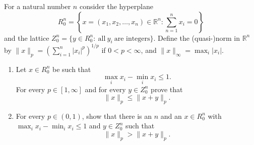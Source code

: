 \documentclass{article}
\begin{document}
\setlength{\parindent}{0pt}
For a natural number $n$ consider the hyperplane
\[
R_0^n=\left\{ x=(x_1,x_2,\dots, x_n)\in \mathbb{R}^n: \sum_{n=1}^n x_i=0\right\}
\]
and the lattice $Z_0^n=\{y\in R_0^n:\ \text{all}\ y_i\  \text{are integers}\}$. 
Define the (quasi-)norm in $\mathbb{R}^n$ by $\lVert x \rVert_p=\left(\sum_{i=1}^n |x_i|^p\right)^{1/p}$ if $0<p<\infty$, and $\lVert x \rVert_\infty=\max_i |x_i|.$
\begin{enumerate}[label=\alph*)]
\item Let $x\in R_0^n$ be such that 
\[
\max_i x_i- \min_i x_i \leq 1.
\]
For every $p\in [1,\infty]$ and for every $y\in Z_0^n$ prove that
\[
\lVert x\rVert_p\leq \lVert x+y\rVert_p.
\]
\item For every $p\in (0,1)$, show that there is an $n$ and an $x\in R_0^n$ with $\max_i x_i -\min_i x_i \leq 1$ and $y\in Z_0^n$ such that 
\[
\lVert x \rVert_p> \lVert x+y\rVert_p.
\]
\end{enumerate}
\end{document}

